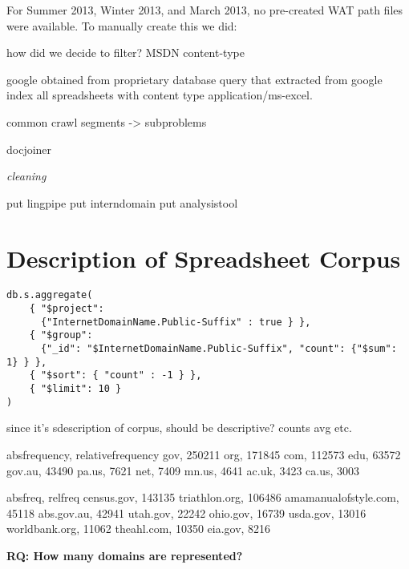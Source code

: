 \documentclass[conference]{IEEEtran}
\begin{document}
For Summer 2013, Winter 2013, and March 2013, no pre-created WAT path files were available. To manually create this we did:




how did we decide to filter? MSDN content-type


google obtained from proprietary database query that extracted from google index all spreadsheets with content type application/ms-excel.

common crawl
segments -> subproblems

docjoiner

\emph{cleaning}

put lingpipe
put interndomain
put analysistool

\section{Description of Spreadsheet Corpus}


\begin{lstlisting}
db.s.aggregate(
    { "$project": 
      {"InternetDomainName.Public-Suffix" : true } },
    { "$group": 
      {"_id": "$InternetDomainName.Public-Suffix", "count": {"$sum": 1} } },
    { "$sort": { "count" : -1 } },
    { "$limit": 10 }
)
\end{lstlisting}


since it's sdescription of corpus, should be descriptive?
counts avg etc.

absfrequency, relativefrequency
gov, 250211
org, 171845
com, 112573
edu, 63572
gov.au, 43490
pa.us, 7621
net, 7409
mn.us, 4641
ac.uk, 3423
ca.us, 3003


absfreq, relfreq
census.gov, 143135
triathlon.org, 106486
amamanualofstyle.com, 45118
abs.gov.au, 42941
utah.gov, 22242
ohio.gov, 16739
usda.gov, 13016
worldbank.org, 11062
theahl.com, 10350
eia.gov, 8216

\noindent\textbf{RQ: How many domains are represented?}
\end{document}
